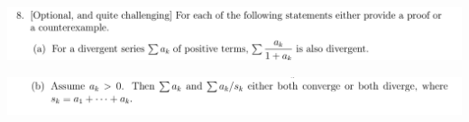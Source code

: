 \documentclass[12pt]{article}
\begin{document}
\newpage
\subsection{}
\begin{mdframed}
\includegraphics[width=400pt]{img/analysis--oxford-M2-I-5-8-a.png}
\end{mdframed}

\begin{mdframed}
\includegraphics[width=400pt]{img/analysis--oxford-M2-I-5-8-b.png}
\end{mdframed}
\end{document}
